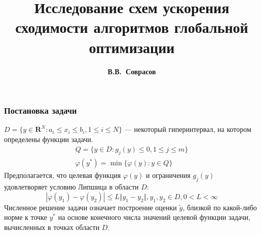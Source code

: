 \documentclass[aspectratio=1610]{beamer}
\title{Исследование схем ускорения сходимости алгоритмов глобальной оптимизации}
\author{\textbf{В.В.~Соврасов}}
\institute{ННГУ им. Н.И. Лобачевского}
\date{}
\begin{document}
\begin{frame}
\titlepage
\end{frame}

\begin{frame}
  \frametitle{Постановка задачи}
    \(D=\{y\in \mathbf{R}^N:a_i\leqslant x_i\leqslant{b_i}, 1\leqslant{i}\leqslant{N}\}\) ---
    некоторый гиперинтервал, на котором определены функции задачи.
  \begin{displaymath}
    \begin{array}{c}
      Q=\{y\in D: g_j(y)\leqslant 0,  1\leqslant{j}\leqslant{m}\}  \\
      \varphi(y^*)=\min\{\varphi(y):y\in Q\}
    \end{array}
  \end{displaymath}
  Предполагается, что целевая функция \(\varphi(y)\) и ограничения \(g_j(y)\) удовлетворяет условию Липшица в области \(D\):
  \begin{displaymath}
  |\varphi(y_1)-\varphi(y_2)|\leqslant L\Vert y_1-y_2\Vert,y_1,y_2\in D,0<L<\infty
  \end{displaymath}
  Численное решение задачи означает построение оценки \(\widetilde{y}\), близкой по какой-либо
  норме к точке \(y^*\) на основе конечного числа значений целевой функции задачи,
  вычисленных в точках области \(D\).
\end{frame}
\end{document}
